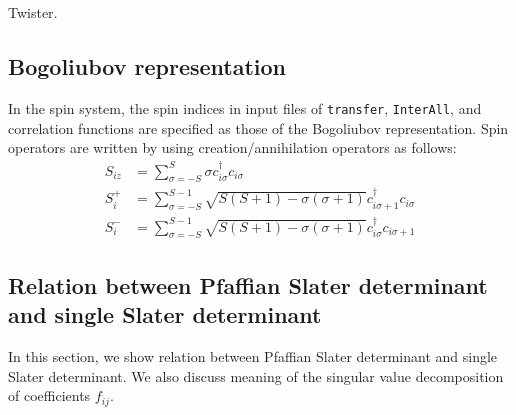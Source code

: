 \chapter{}
\label{Ch:algorithm}

Twister\cite{Mutsuo2008}.

\section{Bogoliubov representation}\label{sec_bogoliubov_rep}

In the spin system,
the spin indices in input files of \verb|transfer|, \verb|InterAll|,
and correlation functions are specified as those of the Bogoliubov representation.
Spin operators are written by using creation/annihilation operators as follows:
\begin{align}
  S_{i z} &= \sum_{\sigma = -S}^{S} \sigma c_{i \sigma}^\dagger c_{i \sigma}
  \\
  S_{i}^+ &= \sum_{\sigma = -S}^{S-1} 
  \sqrt{S(S+1) - \sigma(\sigma+1)} 
  c_{i \sigma+1}^\dagger c_{i \sigma}
  \\
  S_{i}^- &= \sum_{\sigma = -S}^{S-1} 
  \sqrt{S(S+1) - \sigma(\sigma+1)} 
  c_{i \sigma}^\dagger c_{i \sigma+1}
\end{align}

\section{Relation between Pfaffian Slater determinant and single Slater determinant}
\label{sec:PuffAndSlater}
In this section, we show relation between Pfaffian Slater determinant and single Slater determinant.
We also discuss meaning of the singular value decomposition of coefficients $f_{ij}$. 
